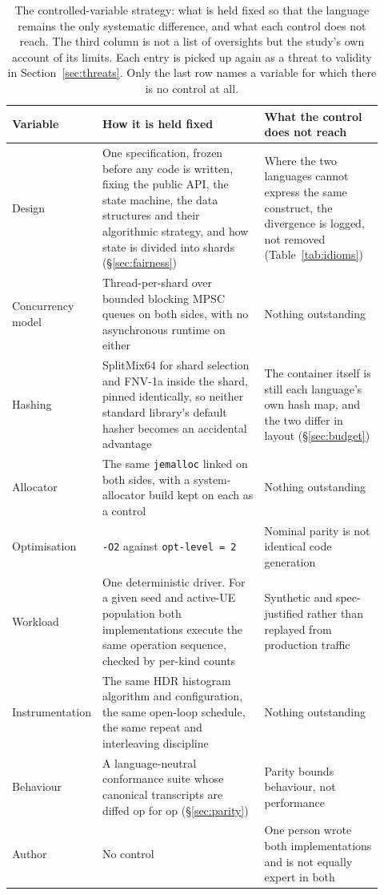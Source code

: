 \documentclass[english,oneside,a4paper,censored,csm,software-track-2020]{HYthesisML}
\renewcommand{\arraystretch}{0.95}
\begin{document}
\begin{table}[H]
\centering
\small
\caption[The controlled-variable strategy]{The controlled-variable strategy: what is held fixed so that the language remains the
only systematic difference, and what each control does not reach. The third column is not a
list of oversights but the study's own account of its limits. Each entry is picked up again as
a threat to validity in Section~\ref{sec:threats}. Only the last row names a variable for
which there is no control at all.\label{tab:controls}}
\footnotesize
\renewcommand{\arraystretch}{1.15}
\begin{tabular}{@{}R{0.16\linewidth} R{0.44\linewidth} R{0.32\linewidth}@{}}
\hline\hline
Variable & How it is held fixed & What the control does not reach \\
\hline
Design & One specification, frozen before any code is written, fixing the public API, the state machine, the data structures and their algorithmic strategy, and how state is divided into shards (\S\ref{sec:fairness}) & Where the two languages cannot express the same construct, the divergence is logged, not removed (Table~\ref{tab:idioms}) \\
Concurrency model & Thread-per-shard over bounded blocking MPSC queues on both sides, with no asynchronous runtime on either & Nothing outstanding \\
Hashing & SplitMix64 for shard selection and FNV-1a inside the shard, pinned identically, so neither standard library's default hasher becomes an accidental advantage & The container itself is still each language's own hash map, and the two differ in layout (\S\ref{sec:budget}) \\
Allocator & The same \texttt{jemalloc} linked on both sides, with a system-allocator build kept on each as a control & Nothing outstanding \\
Optimisation & \texttt{-O2} against \texttt{opt-level~=~2} & Nominal parity is not identical code generation \\
Workload & One deterministic driver. For a given seed and active-UE population both implementations execute the same operation sequence, checked by per-kind counts & Synthetic and spec-justified rather than replayed from production traffic \\
Instrumentation & The same HDR histogram algorithm and configuration, the same open-loop schedule, the same repeat and interleaving discipline & Nothing outstanding \\
Behaviour & A language-neutral conformance suite whose canonical transcripts are diffed op for op (\S\ref{sec:parity}) & Parity bounds behaviour, not performance \\
\hline
Author & No control & One person wrote both implementations and is not equally expert in both \\
\hline
\end{tabular}
\end{table}
\end{document}

